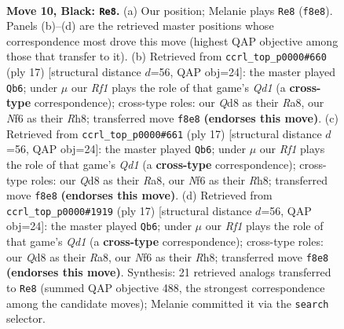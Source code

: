 \documentclass[11pt]{article}
\begin{document}
\clearpage

\begin{figure}[p]\centering
\begin{subfigure}{0.46\textwidth}\centering
\resizebox{\linewidth}{!}{%
\newchessgame
\chessboard[
  setfen={rnbq1rk1/p5pp/2pb1n2/1p1p1p2/3P1B2/5NP1/PPQ1PPBP/RN3RK1 b - - 1 10},
  showmover=false,
  pgfstyle=straightmove, color=movearrow, markmove={f8-e8}
]}
\caption{}
\end{subfigure}\hfill
\begin{subfigure}{0.46\textwidth}\centering
\resizebox{\linewidth}{!}{%
\newchessgame
\chessboard[
  setfen={r2qk2r/pp1nbppp/2p1pn2/5b2/3P4/1Q3NP1/PP2PPBP/RNB2RK1 b kq - 5 9},
  showmover=false,
  pgfstyle=straightmove, color=movearrow, markmove={d8-b6}
]}
\caption{}
\end{subfigure}
\\[4pt]
\begin{subfigure}{0.46\textwidth}\centering
\resizebox{\linewidth}{!}{%
\newchessgame
\chessboard[
  setfen={r2qk2r/pp1nbppp/2p1pn2/5b2/3P4/1Q3NP1/PP2PPBP/RNB2RK1 b kq - 5 9},
  showmover=false,
  pgfstyle=straightmove, color=movearrow, markmove={d8-b6}
]}
\caption{}
\end{subfigure}\hfill
\begin{subfigure}{0.46\textwidth}\centering
\resizebox{\linewidth}{!}{%
\newchessgame
\chessboard[
  setfen={r2qk2r/pp1nbppp/2p1pn2/5b2/3P4/1Q3NP1/PP2PPBP/RNB2RK1 b kq - 5 9},
  showmover=false,
  pgfstyle=straightmove, color=movearrow, markmove={d8-b6}
]}
\caption{}
\end{subfigure}
\caption{\textbf{Move 10, Black: \texttt{Re8}.} (a) Our position; Melanie plays \texttt{Re8} (\texttt{f8e8}). Panels (b)--(d) are the retrieved master positions whose correspondence most drove this move (highest QAP objective among those that transfer to it). (b) Retrieved from \texttt{ccrl\_top\_p0000\#660} (ply 17) [structural distance $d$=56, QAP obj=24]: the master played \texttt{Qb6}; under $\mu$ our \emph{Rf1} plays the role of that game's \emph{Qd1} (a \textbf{cross-type} correspondence); cross-type roles: our \emph{Q}d8 as their \emph{R}a8, our \emph{N}f6 as their \emph{R}h8; transferred move \texttt{f8e8} \textbf{(endorses this move)}. (c) Retrieved from \texttt{ccrl\_top\_p0000\#661} (ply 17) [structural distance $d$=56, QAP obj=24]: the master played \texttt{Qb6}; under $\mu$ our \emph{Rf1} plays the role of that game's \emph{Qd1} (a \textbf{cross-type} correspondence); cross-type roles: our \emph{Q}d8 as their \emph{R}a8, our \emph{N}f6 as their \emph{R}h8; transferred move \texttt{f8e8} \textbf{(endorses this move)}. (d) Retrieved from \texttt{ccrl\_top\_p0000\#1919} (ply 17) [structural distance $d$=56, QAP obj=24]: the master played \texttt{Qb6}; under $\mu$ our \emph{Rf1} plays the role of that game's \emph{Qd1} (a \textbf{cross-type} correspondence); cross-type roles: our \emph{Q}d8 as their \emph{R}a8, our \emph{N}f6 as their \emph{R}h8; transferred move \texttt{f8e8} \textbf{(endorses this move)}. Synthesis: 21 retrieved analogs transferred to \texttt{Re8} (summed QAP objective 488, the strongest correspondence among the candidate moves); Melanie committed it via the \texttt{search} selector.}
\label{fig:thought-m19}
\end{figure}
\end{document}
